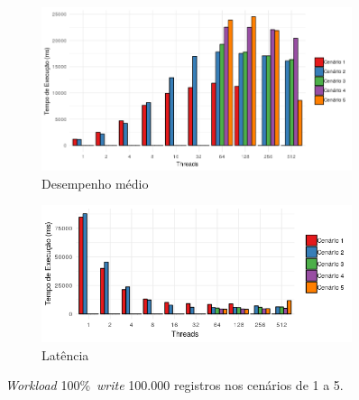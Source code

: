 \documentclass[12pt]{article}
\begin{document}
\begin{figure}
    \centering
    \begin{subfigure}[b]{0.49\textwidth}
        \centering
        \includegraphics[width=\textwidth]{images/figura11}
        \caption{Desempenho médio}
        \label{figura11}
    \end{subfigure}
        \hfill
    \begin{subfigure}[b]{0.49\textwidth}  
        \centering 
        \includegraphics[width=\textwidth]{images/figura12}
        \caption{Latência}%
        \label{figura12}
    \end{subfigure}
    \caption{\emph{Workload} 100\%~\emph{write} 100.000 registros nos cenários de 1 a 5.}
\end{figure}
\end{document}
